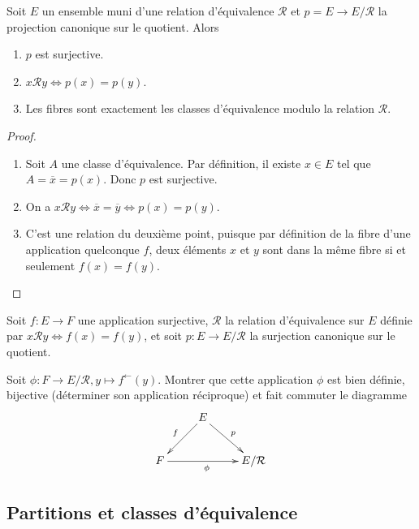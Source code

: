 \begin{proposition}
Soit $E$ un ensemble muni d'une relation d'équivalence ${\mathcal R}$ et $p = E\to E/\mathcal R$ la projection canonique sur le quotient. Alors 
\begin{enumerate}
\item $p$ est surjective.
\item $x\mathcal R y \iff p(x)=p(y)$.
\item Les fibres sont exactement les classes d'équivalence modulo la relation $\mathcal R$.
\end{enumerate}
\end{proposition}
\begin{proof}
\begin{enumerate}
\item Soit $A$ une classe d'équivalence. Par définition, il existe $x\in E$ tel que $A = \overline{x} = p(x)$. Donc $p$ est surjective.
\item On a $x\mathcal R y \iff \overline{x} = \overline{y} \iff p(x)=p(y)$.
\item C'est une relation du deuxième point, puisque par définition de la fibre d'une application quelconque $f$, deux éléments $x$ et $y$ sont dans la même fibre si et seulement $f(x)=f(y)$.
\end{enumerate}
\end{proof}

\begin{exercice}
Soit $f : E\to F$ une application surjective, $\mathcal R$ la relation d'équivalence sur $E$ définie par $x\mathcal R y \iff f(x)=f(y)$, et soit $p : E\to E/\mathcal R$ la surjection canonique sur le quotient. 

Soit $\phi :  F \to E/\mathcal R, y\mapsto f^\leftarrow(y)$. Montrer que  cette application $\phi$ est bien définie, bijective (déterminer son application réciproque) et fait commuter le diagramme
\[\xymatrix{
& E \ar[dl]_{f} \ar[dr]^p & \\
F \ar[rr]_{\phi}& & E/\mathcal R
}\]
\end{exercice}



\subsection{Partitions et classes d'équivalence}

